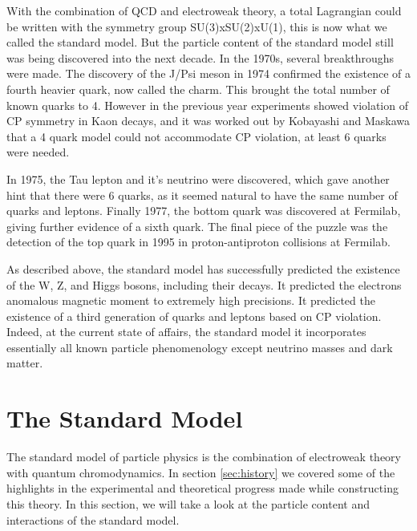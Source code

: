     With the combination of QCD and electroweak theory, a total Lagrangian could be written with the symmetry group SU(3)xSU(2)xU(1), this is now what we called the standard model. But the particle content of the standard model still was being discovered into the next decade. In the 1970s, several breakthroughs were made. The discovery of the J/Psi meson in 1974 confirmed the existence of a fourth heavier quark, now called the charm. This brought the total number of known quarks to 4. However in the previous year experiments showed violation of CP symmetry in Kaon decays, and it was worked out by Kobayashi and Maskawa that a 4 quark model could not accommodate CP violation, at least 6 quarks were needed. 

    In 1975, the Tau lepton and it's neutrino were discovered, which gave another hint that there were 6 quarks, as it seemed natural to have the same number of quarks and leptons. Finally 1977, the bottom quark was discovered at Fermilab, giving further evidence of a sixth quark. The final piece of the puzzle was the detection of the top quark in 1995 in proton-antiproton collisions at Fermilab.

    As described above, the standard model has successfully predicted the existence of the W, Z, and Higgs bosons, including their decays. It predicted the electrons anomalous magnetic moment to extremely high precisions. It predicted the existence of a third generation of quarks and leptons based on CP violation. Indeed, at the current state of affairs, the standard model it incorporates essentially all known particle phenomenology except neutrino masses and dark matter.

\section{The Standard Model}
  The standard model of particle physics is the combination of electroweak theory with quantum chromodynamics. In section \ref{sec:history} we covered some of the highlights in the experimental and theoretical progress made while constructing this theory. In this section, we will take a look at the particle content and interactions of the standard model. 

